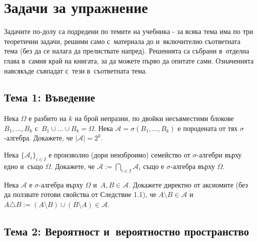 \chapter*{Задачи за упражнение}

\begin{rembox}
Задачите по-долу са подредени по темите на учебника - за всяка тема
има по три теоретични задачи, решими само с~материала до и~включително
съответната тема (без да се налага да прелиствате напред). Решенията
са събрани в~отделна глава в~самия край на книгата, за да можете
първо да опитате сами. Означенията навсякъде съвпадат с~тези в~съответната тема.
\end{rembox}

\section*{Тема 1: Въведение}

\begin{probbox}[Задача 1.1]
Нека $\Omega$ е разбито на $k$ на брой непразни, по двойки
несъвместими блокове $B_1,\dots,B_k$ с~$B_1\cup\dots\cup B_k=\Omega$.
Нека $\mathcal A=\sigma(B_1,\dots,B_k)$ е породената от тях
$\sigma$-алгебра. Докажете, че $|\mathcal A|=2^k$.
\end{probbox}

\begin{probbox}[Задача 1.2]
Нека $\{\mathcal A_i\}_{i\in I}$ е произволно (дори неизброимо)
семейство от $\sigma$-алгебри върху едно и~също $\Omega$. Докажете,
че $\mathcal A:=\bigcap_{i\in I}\mathcal A_i$ също е $\sigma$-алгебра
върху $\Omega$.
\end{probbox}

\begin{probbox}[Задача 1.3]
Нека $\mathcal A$ е $\sigma$-алгебра върху $\Omega$ и~$A,B\in
\mathcal A$. Докажете директно от аксиомите (без да ползвате готови
свойства от Следствие 1.1), че $A\setminus B\in\mathcal A$ и~$A\triangle B:=(A\setminus B)\cup(B\setminus A)\in\mathcal A$.
\end{probbox}

\section*{Тема 2: Вероятност и~вероятностно пространство}


